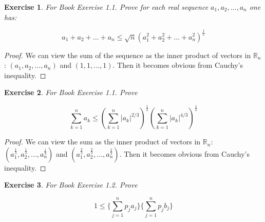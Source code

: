 \documentclass{article}
\newtheorem{exercise}{Exercise}[section]
\begin{document}
\begin{exercise}
    For Book Exercise 1.1. Prove for each real sequence $a_1, a_2, ..., a_n$ one has:

    \begin{equation*}
        a_1 + a_2 + ... + a_n \leq \sqrt{n}(a_1^2 + a_2^2 + ... + a_n^2)^{\frac{1}{2}}
    \end{equation*}

\end{exercise}

\begin{proof}
    We can view the sum of the sequence as the inner product of vectors in $\mathbb{R}_n$: $(a_1, a_2, ..., a_n)$ and $(1, 1, ..., 1)$. Then it becomes obvious from Cauchy's inequality.
\end{proof}
\begin{exercise}
    For Book Exercise 1.1. Prove

    \begin{equation*}
        \sum_{k=1}^{n}{a_k} \leq (\sum_{k=1}^{n}{|a_k|^{2/3}})^{\frac{1}{2}} (\sum_{k=1}^{n}{|a_k|^{4/3}})^{\frac{1}{2}}
    \end{equation*}

\end{exercise}

\begin{proof}
    We can view the sum as the inner product of vectors in $\mathbb{R}_n$: $(a_1^{\frac{1}{3}}, a_2^{\frac{1}{3}}, ..., a_n^{\frac{1}{3}})$ and $(a_1^{\frac{2}{3}}, a_2^{\frac{2}{3}}, ..., a_n^{\frac{2}{3}})$. Then it becomes obvious from Cauchy's inequality.
\end{proof}

\begin{exercise}
    For Book Exercise 1.2. Prove

    \begin{equation*}
        1 \leq \bigg\{\sum_{j = 1}^{n}{p_ja_j}\bigg\} \bigg\{\sum_{j = 1}^{n}{p_jb_j}\bigg\}
    \end{equation*}

\end{exercise}
\end{document}

